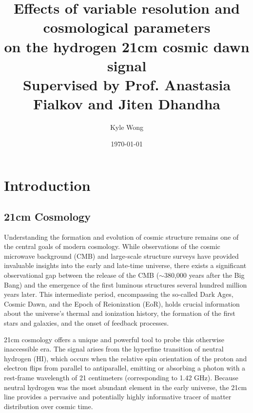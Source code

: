 \documentclass[floats,floatfix,showpacs,amssymb,prd,superscriptaddress,nofootinbib]{revtex4-2} %
\begin{document}
\title{{\titlefont Effects of variable resolution and cosmological parameters
\\on the hydrogen 21cm cosmic dawn signal}\\{\small Supervised by Prof. Anastasia Fialkov and Jiten Dhandha}}
\date{\today}
\author{Kyle Wong}


\maketitle
\section{Introduction}
\subsection{21cm Cosmology}
Understanding the formation and evolution of cosmic structure remains one of the central goals of modern cosmology. While observations of the cosmic microwave background (CMB) and large-scale structure surveys have provided invaluable insights into the early and late-time universe, there exists a significant observational gap between the release of the CMB ($\sim$380,000 years after the Big Bang) and the emergence of the first luminous structures several hundred million years later. This intermediate period, encompassing the so-called Dark Ages, Cosmic Dawn, and the Epoch of Reionization (EoR), holds crucial information about the universe's thermal and ionization history, the formation of the first stars and galaxies, and the onset of feedback processes.

21cm cosmology offers a unique and powerful tool to probe this otherwise inaccessible era. The signal arises from the hyperfine transition of neutral hydrogen (HI), which occurs when the relative spin orientation of the proton and electron flips from parallel to antiparallel, emitting or absorbing a photon with a rest-frame wavelength of 21 centimeters (corresponding to 1.42 GHz). Because neutral hydrogen was the most abundant element in the early universe, the 21cm line provides a pervasive and potentially highly informative tracer of matter distribution over cosmic time.
\end{document}
